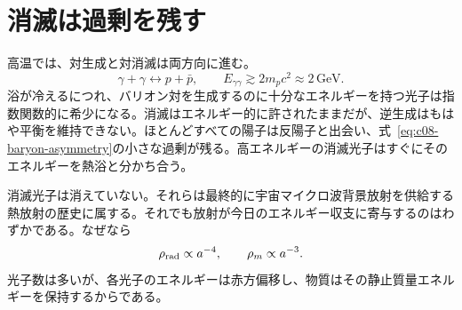 \section{消滅は過剰を残す}

高温では、対生成と対消滅は両方向に進む。
\begin{equation}
\gamma+\gamma\longleftrightarrow p+\bar p,
\qquad
E_{\gamma\gamma}\gtrsim2m_pc^2\approx2\,\mathrm{GeV}.
\end{equation}
浴が冷えるにつれ、バリオン対を生成するのに十分なエネルギーを持つ光子は指数関数的に希少になる。消滅はエネルギー的に許されたままだが、逆生成はもはや平衡を維持できない。ほとんどすべての陽子は反陽子と出会い、式~\eqref{eq:c08-baryon-asymmetry}の小さな過剰が残る。高エネルギーの消滅光子はすぐにそのエネルギーを熱浴と分かち合う。

\begin{classroomqa}
\end{classroomqa}

\begin{classroomqa}
\end{classroomqa}

消滅光子は消えていない。それらは最終的に宇宙マイクロ波背景放射を供給する熱放射の歴史に属する。それでも放射が今日のエネルギー収支に寄与するのはわずかである。なぜなら
\begin{equation}
\rho_{\rm rad}\propto a^{-4},
\qquad
\rho_m\propto a^{-3}.
\end{equation}
光子数は多いが、各光子のエネルギーは赤方偏移し、物質はその静止質量エネルギーを保持するからである。

\begin{classroomqa}
\end{classroomqa}

